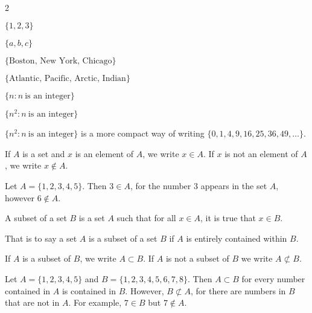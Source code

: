 \documentclass[crop=false,class=article,oneside]{standalone}
\begin{document}
        \begin{example}
            \
            \begin{enumerate}
            \end{enumerate}
        \end{example}
        \begin{remark}
            $\{n^2: n\ \textrm{is an integer}\}$ is a more compact way
            of writing $\{0,1,4,9,16,25,36,49,\hdots\}$.
        \end{remark}
        \begin{notation}
            If $A$ is a set and $x$ is an element of $A$,
            we write $x\in{A}$. If $x$ is not an element of $A$,
            we write $x\notin{A}$.
        \end{notation}
        \begin{example}
            Let $A = \{1,2,3,4,5\}$. Then $3\in{A}$, for the number
            $3$ appears in the set $A$, however $6\notin{A}$.
        \end{example}
        \begin{definition}
            A subset of a set $B$ is a set $A$ such that for all
            $x\in{A}$, it is true that $x\in{B}$.
        \end{definition}
        \begin{remark}
            That is to say a set $A$ is a subset of a set $B$ if $A$
            is entirely contained within $B$.
        \end{remark}
        \begin{notation}
            If $A$ is a subset of $B$, we write $A\subset B$. If $A$ is
            not a subset of $B$ we write $A\not\subset{B}$.
        \end{notation}
        \begin{example}
            Let $A=\{1,2,3,4,5\}$ and $B=\{1,2,3,4,5,6,7,8\}$.
            Then $A\subset B$ for every number contained in $A$ is
            contained in $B$. However, $B\not\subset{A}$, for there are
            numbers in $B$ that are not in $A$.
            For example, $7\in{B}$ but $7\notin{A}$.
        \end{example}
\end{document}
